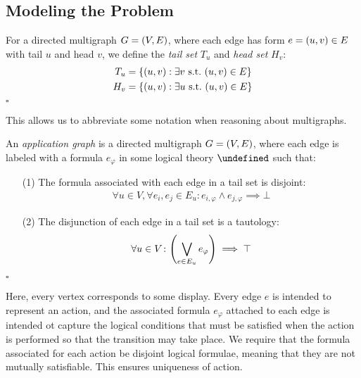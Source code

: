 \documentclass[12pt]{article}
\newcommand{\form}{\ensuremath{\varphi}}
\let\domform\undefined
\newcommand{\domform}{\ensuremath{\mathcal{F}}}
\begin{document}
\subsection{Modeling the Problem}
\begin{definition}
For a directed multigraph $G = {\left(V, E\right)}$,
where each edge has form $e = {\left(u, v\right)} \in E$ with tail $u$ and head $v$,
we define the \textit{tail set} $T_u$ and \textit{head set} $H_v$:
\begin{align*}
  T_u &= {\left\{{\left(u, v\right)} : \exists v {\ \mathrm{s.t.}\ } {\left(u, v\right)} \in E\right\}} \\
  H_v &= {\left\{{\left(u, v\right)} : \exists u {\ \mathrm{s.t.}\ } {\left(u, v\right)} \in E\right\}}
\end{align*}
$\square$
\end{definition}

This allows us to abbreviate some notation when reasoning about multigraphs.

\begin{definition}
An \textit{application graph} is a directed multigraph $G = {\left(V, E\right)}$,
where each edge is labeled with a formula $e_{\form}$ in some logical
theory $\domform$ such that:
\begin{enumerate}
  \item[(1)]
    The formula associated with each edge in a tail set is disjoint:
    \begin{align*}
      \forall u \in V,
      \forall e_i, e_j \in E_u
      \colon
      e_{i, \form} \land e_{j, \form} \implies \bot
    \end{align*}

  \item[(2)]
    The disjunction of each edge in a tail set is a tautology:
    \begin{align*}
      \forall u \in V
      \colon
      \parens{\bigvee_{e \in E_u} e_{\form}} \implies \top
    \end{align*}
\end{enumerate}
$\square$
\end{definition}

Here, every vertex corresponds to some display.
Every edge $e$ is intended to represent an action, and the associated
formula $e_{\form}$ attached to each edge is intended ot capture the
logical conditions that must be satisfied when the action is performed
so that the transition may take place.
We require that the formula associated for each action be disjoint logical
formulae, meaning that they are not mutually satisfiable.
This ensures uniqueness of action.
\end{document}
